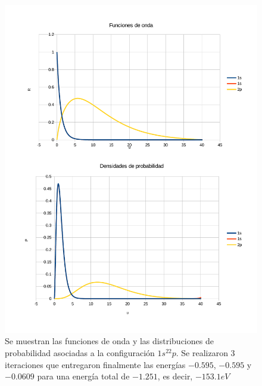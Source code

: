 \documentclass[a4paper]{article}
\begin{document}
\begin{figure}
\begin{center}
\includegraphics[width = \textwidth]{1s_1s_2p.pdf}
\caption{\label{fig:2p}Se muestran las funciones de onda y las distribuciones de probabilidad asociadas a la configuración $1s^22p$. Se realizaron 3 iteraciones que entregaron finalmente las energías $-0.595$, $-0.595$ y $-0.0609$ para una energía total de $-1.251$, es decir, $-153.1eV$}
\end{center}
\end{figure}
\end{document}

